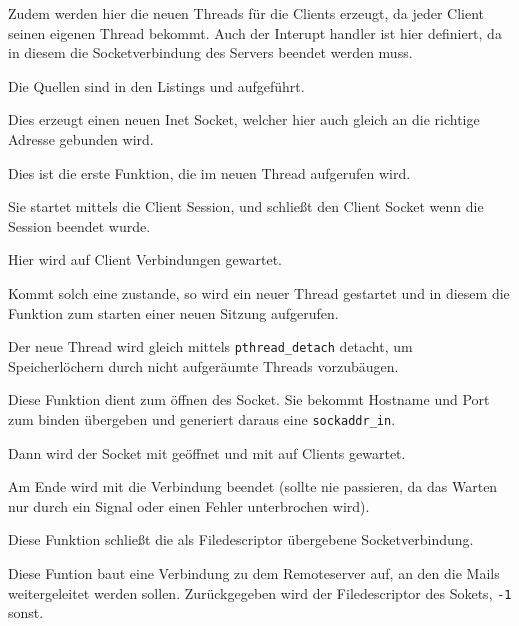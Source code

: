 Zudem werden hier die neuen Threads f\"{u}r die Clients erzeugt, da jeder Client seinen eigenen Thread bekommt. Auch der Interupt handler ist hier definiert, da in diesem die Socketverbindung des Servers beendet werden muss.

Die Quellen sind in den Listings  und  aufgef\"{u}hrt.




\label{fn:create_socket}
Dies erzeugt einen neuen Inet Socket, welcher hier auch gleich an die richtige Adresse gebunden wird.

\label{fn:process_client}
Dies ist die erste Funktion, die im neuen Thread aufgerufen wird.

Sie startet mittels  die Client Session, und schließt den Client Socket wenn die Session beendet wurde.

\label{fn:wait_connect}
Hier wird auf Client Verbindungen gewartet. 

Kommt solch eine zustande, so wird ein neuer Thread gestartet und in diesem die Funktion  zum starten einer neuen Sitzung aufgerufen.

Der neue Thread wird gleich mittels \texttt{pthread\_detach} detacht, um Speicherl\"{o}chern durch nicht aufger\"{a}umte Threads vorzub\"{a}ugen.

\label{fn:create_conn}
Diese Funktion dient zum \"{o}ffnen des Socket. Sie bekommt Hostname und Port zum binden \"{u}bergeben und generiert daraus eine \texttt{sockaddr\_in}.

Dann wird der Socket mit  ge\"{o}ffnet und mit  auf Clients gewartet.

Am Ende wird mit  die Verbindung beendet (sollte nie passieren, da das Warten nur durch ein Signal oder einen Fehler unterbrochen wird).


\label{fn:quit_conn}
Diese Funktion schließt die als Filedescriptor \"{u}bergebene Socketverbindung.


\label{fn:create_remote_conn}
Diese Funtion baut eine Verbindung zu dem Remoteserver auf, an den die Mails weitergeleitet werden sollen. Zur\"{u}ckgegeben wird der Filedescriptor des Sokets, \texttt{-1} sonst.

